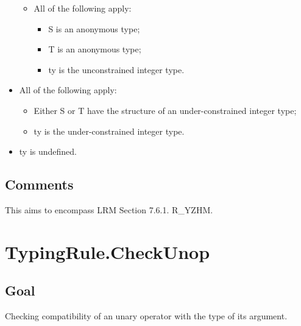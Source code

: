 \documentclass{book}
\begin{document}
\begin{itemize}
\begin{itemize}
      \item  All of the following apply:
        \begin{itemize}
        \item  S is an anonymous type;
        \item  T is an anonymous type;
	\item  ty is the unconstrained integer type. 
        \end{itemize}
    \end{itemize}

  \item  All of the following apply:
    \begin{itemize}
    \item  Either S or T have the structure of an under-constrained integer type;
    \item  ty is the under-constrained integer type. 
    \end{itemize}

  \item  ty is undefined.
  \end{itemize}

\subsection{Comments}
  This aims to encompass LRM Section 7.6.1. R\_YZHM.

\section{TypingRule.CheckUnop}

\subsection{Goal}
  Checking compatibility of an unary operator with the type of its argument.
\end{document}
